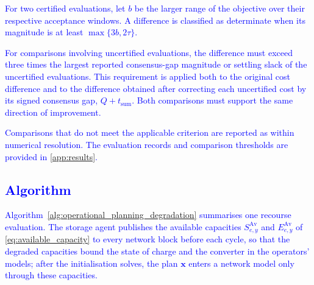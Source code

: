 \documentclass[preprint,12pt]{elsarticle}
\begin{document}
\textcolor{blue}{
    For two certified evaluations, let $b$ be the larger range of the objective over their respective acceptance windows. A difference is classified as determinate when its magnitude is at least $\max\{3b,2\tau\}$.
}

\textcolor{blue}{
    For comparisons involving uncertified evaluations, the difference must exceed three times the largest reported consensus-gap magnitude or settling slack of the uncertified evaluations. This requirement is applied both to the original cost difference and to the difference obtained after correcting each uncertified cost by its signed consensus gap, $Q+t_{\text{sum}}$. Both comparisons must support the same direction of improvement.
}

\textcolor{blue}{
    Comparisons that do not meet the applicable criterion are reported as within numerical resolution. The evaluation records and comparison thresholds are provided in \ref{app:results}.
}

\subsection{\textcolor{blue}{Algorithm}}
\label{app:admm_updated_algorithm}

\textcolor{blue}{
    Algorithm~\ref{alg:operational_planning_degradation} summarises one recourse evaluation. The storage agent publishes the available capacities $S^{\text{Av}}_{e,y}$ and $E^{\text{Av}}_{e,y}$ of \eqref{eq:available_capacity} to every network block before each cycle, so that the degraded capacities bound the state of charge and the converter in the operators' models; after the initialisation solves, the plan $\boldsymbol{x}$ enters a network model only through these capacities.
}
\end{document}
